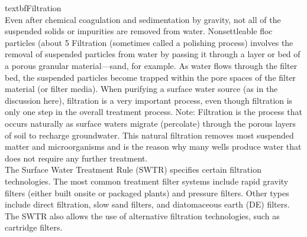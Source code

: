 textbf{Filtration}\\
Even after chemical coagulation and sedimentation by gravity, not all of the suspended solids or impurities are removed from water. Nonsettleable floc particles (about 5%
Filtration (sometimes called a polishing process) involves the removal of suspended particles from water by passing it through a layer or bed of a porous granular material—sand, for example. As water flows through the filter bed, the suspended particles become trapped within the pore spaces of the filter material (or filter media). When purifying a surface water source (as in the discussion here), filtration is a very important process, even though filtration is only one step in the overall treatment process.
Note: Filtration is the process that occurs naturally as surface waters migrate (percolate) through the porous layers of soil to recharge groundwater. This natural filtration removes most suspended matter and microorganisms and is the reason why many wells produce water that does not require any further treatment.\\
The Surface Water Treatment Rule (SWTR) specifies certain filtration technologies. The most common treatment filter systems include rapid gravity filters (either built onsite or packaged plants) and pressure filters. Other types include direct filtration, slow sand filters, and diatomaceous earth (DE) filters. The SWTR also allows the use of alternative filtration technologies, such as cartridge filters.\\
